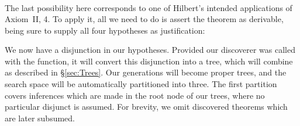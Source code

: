 {\begin{minipage}{\linewidth}
\begin{displaymath}
\begin{split}
     \end{split}
   \end{displaymath}
\end{minipage}}\linebreak

The last possibility here corresponds to one of Hilbert's intended applications of Axiom~II, 4. To apply it, all we need to do is assert the theorem as  derivable, being sure to supply all four hypotheses as justification:

\linebreak

We now have a disjunction in our hypotheses. Provided our discoverer was called with the  function, it will convert this disjunction into a tree, which will combine as described in \S\ref{sec:Trees}. Our generations will become proper trees, and the search space will be automatically partitioned into three. The first partition covers inferences which are made in the root node of our trees, where no particular disjunct is assumed. For brevity, we omit discovered theorems which are later subsumed.

